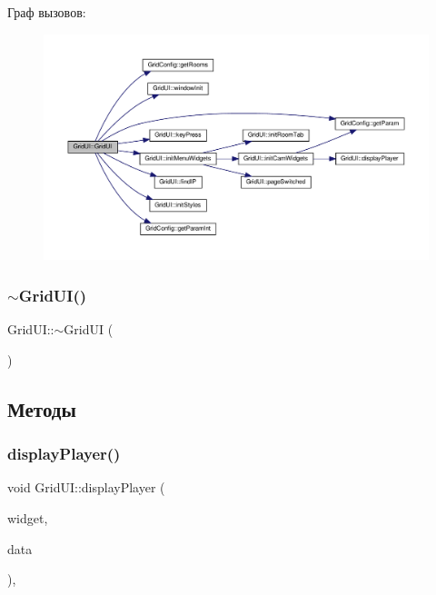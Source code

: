 Граф вызовов\+:\nopagebreak
\begin{figure}[H]
\begin{center}
\leavevmode
\includegraphics[width=350pt]{class_grid_u_i_a3fb2c00058a899778812018dea387e24_cgraph}
\end{center}
\end{figure}
\mbox{\label{class_grid_u_i_acc680397d82028287a7ba8e89598679f}} 
\subsubsection{\texorpdfstring{$\sim$\+Grid\+U\+I()}{~GridUI()}}
{\footnotesize\ttfamily Grid\+U\+I\+::$\sim$\+Grid\+UI (\begin{DoxyParamCaption}{ }\end{DoxyParamCaption})}



\subsection{Методы}
\mbox{\label{class_grid_u_i_a11288c74a4c369aabb0ca17da1495a5d}} 
\subsubsection{\texorpdfstring{display\+Player()}{displayPlayer()}}
{\footnotesize\ttfamily void Grid\+U\+I\+::display\+Player (\begin{DoxyParamCaption}\item[{Gtk\+Widget $\ast$}]{widget,  }\item[{gpointer}]{data }\end{DoxyParamCaption})\hspace{0.3cm}{\ttfamily [static]}, {\ttfamily [private]}}

